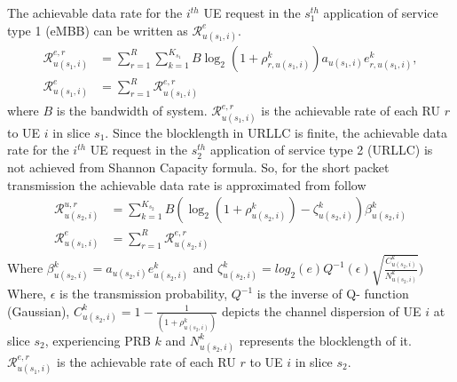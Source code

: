 \documentclass[conference]{IEEEtran}
\begin{document}
The achievable data rate for the $i^{th}$ UE request in the $s_{1}^{th}$ application of service type 1 (eMBB) can be written as $\mathcal{R}_{u(s_1,i)}^{e}$.
\begin{equation}\label{eq1}
\begin{split}
\mathcal{R}_{u(s_1,i)}^{e,r} &= \sum_{r=1}^{R}\sum_{k=1}^{K_{s_1}} B \log_2({1+ \rho_{r,u(s_1,i)}^{k}})a_{u(s_1,i)} e^k_{r,u(s_1,i)},\\
\mathcal{R}_{u(s_1,i)}^{e} &= \sum_{r=1}^{R}\mathcal{R}_{u(s_1,i)}^{e,r} 
\end{split}
\end{equation}
where $B$ is the bandwidth of system. 
$\mathcal{R}_{u(s_1,i)}^{e,r}$ is the achievable rate of each RU $r$ to UE $i$ in slice $s_1$.
Since the blocklength in URLLC is finite, the achievable data rate for the $i^{th}$ UE request in the $s_{2}^{th}$ application of service type 2 (URLLC) is not achieved from Shannon Capacity formula. So, for the short packet transmission the achievable data rate is approximated from follow
\begin{equation}\label{eq11}
\begin{split}
\mathcal{R}_{u(s_2,i)}^{u,r} &= \sum_{k=1}^{K_{s_2}} B (\log_2({1+ \rho_{u(s_2,i)}^{k}})- \zeta_{u(s_2,i)}^{k}){\beta}_{u(s_2,i)}^{k}\\
\mathcal{R}_{u(s_1,i)}^{e} &= \sum_{r=1}^{R}\mathcal{R}_{u(s_2,i)}^{e,r} 
\end{split}
\end{equation}
Where ${\beta}_{u(s_2,i)}^{k}=a_{u(s_2,i)} e^{k}_{u(s_2,i)}$
and $\zeta_{u(s_2,i)}^{k} = log_2({e})Q^{-1}(\epsilon) \sqrt{\frac{C_{u(s_2,i)}^{k}}{N_{u(s_2,i)}^{k}}})$
Where, $\epsilon $ is the transmission probability, $Q^{-1}$ is the inverse of Q- function (Gaussian),
$C_{u(s_2,i)}^{k} = 1 - \frac{1}{(1+\rho_{u(s_2,i)}^{k})}$ depicts the channel dispersion of UE  $i$ at slice $s_2$, experiencing PRB $k$ and
$N_{u(s_2,i)}^{k}$ represents the blocklength of it. 
$\mathcal{R}_{u(s_1,i)}^{e,r}$ is the achievable rate of each RU $r$ to UE $i$ in slice $s_2$.
\end{document}
